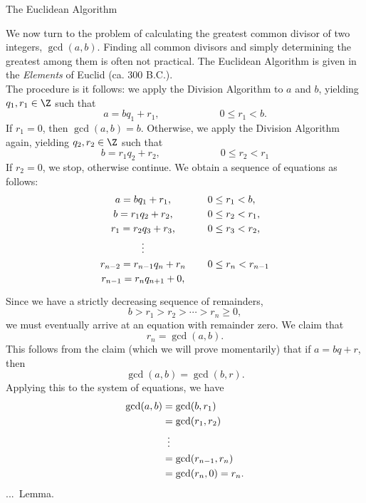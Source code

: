 \documentclass[smaller,hyperref={CJKbookmarks=true}]{beamer}
\newcounter{zhuo}[subsection]
\renewcommand{\thezhuo}{\thesection.\thesubsection.\arabic{zhuo}}
\newenvironment{LEMMA}{\stepcounter{zhuo}\alert{\thezhuo.~Lemma.\,}}{}
\begin{document}
\begin{frame}{The Euclidean Algorithm}
\begin{spacing}{1.05}
We now turn to the problem of calculating the greatest common divisor of
two integers, $\gcd(a,b)$. Finding all common divisors and simply
determining the greatest among them is often not practical. The
Euclidean Algorithm is given in the \emph{Elements} of Euclid (ca. 300 B.C.).\\[4pt]
The procedure is it follows: we apply the Division Algorithm to $a$ and $b$, yielding $q_1,r_1\in\Z$ such that
\[a=bq_1+r_1,\qquad\qquad\qquad
0\leq r_1<b.\]
If $r_1=0$, then $\gcd(a,b)=b$. Otherwise, we apply the Division Algorithm again, yielding $q_2,r_2\in\Z$ such that
\[b=r_1q_2+r_2,\qquad\qquad\qquad
0\leq r_2<r_1\]
If $r_2=0$, we stop, otherwise continue.
\newpage
We obtain a sequence of equations as follows:
\begin{equation*}
 \begin{tabular}{cl}
   $a=bq_1+r_1$, &~~~$0\leq r_1<b$, \\[2.5pt]
   $b=r_1q_2+r_2$, &~~~$0\leq r_2<r_1$, \\[2.5pt]
   $r_1=r_2q_3+r_3$, &~~~$0\leq r_3<r_2$, \\[2.5pt]
   \vdots &  \\[2.5pt]
   $r_{n-2}=r_{n-1}q_n+r_n$ &~~~$0\leq r_n<r_{n-1}$ \\[2.5pt]
   $r_{n-1}=r_nq_{n+1}+0$, & \\[2.5pt]
 \end{tabular}
\end{equation*}
Since we have a strictly decreasing sequence of remainders,
\[b>r_1>r_2>\cdots>r_n\geq0,\]
we must eventually arrive at an equation with remainder zero.
\newpage
We claim that
\[r_n=\gcd(a,b).\]
This follows from the claim (which we will prove momentarily) that if $a=bq+r$, then
\[\gcd(a,b)=\gcd(b,r).\]
Applying this to the system of equations, we have
\begin{equation*}
  \begin{split}
     \gcd(a,b) &=\gcd(b,r_1) \\
       &=\gcd(r_1,r_2)  \\
       &\enskip\vdots  \\
       &=\gcd(r_{n-1},r_n)  \\
       &=\gcd(r_n,0)=r_n.
  \end{split}
\end{equation*}
\newpage
\begin{LEMMA}

\end{LEMMA}
\end{spacing}
\end{frame}
\end{document}
